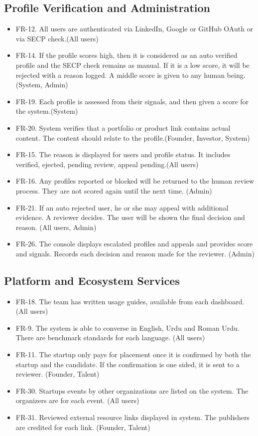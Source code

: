 \documentclass{FastFyp}
\begin{document}
\subsection{Profile Verification and Administration}
\begin{itemize}
\item FR-12. All users are authenticated via LinkedIn, Google or GitHub OAuth or via SECP check.(All users)
\item FR-14. If the profile scores high, then it is considered as an auto verified profile and the SECP check remains as manual. If it is a low score, it will be rejected with a reason logged. A middle score is given to any human being. (System, Admin)
\item FR-19. Each profile is assessed from their signals, and then given a score for the system.(System)
\item FR-20. System verifies that a portfolio or product link contains actual content. The content should relate to the profile.(Founder, Investor, System)
\item FR-15. The reason is displayed for users and profile status. It includes verified, ejected, pending review, appeal pending.(All users)
\item FR-16. Any profiles reported or blocked will be returned to the human review process. They are not scored again until the next time. (Admin)
\item FR-21. If an auto rejected user, he or she may appeal with additional evidence. A reviewer decides. The user will be shown the final decision and reason. (All users, Admin)
\item FR-26. The console displays escalated profiles and appeals and provides score and signals. Records each decision and reason made for the reviewer. (Admin)
\end{itemize}

\subsection{Platform and Ecosystem Services}
\begin{itemize}
\item FR-18. The team has written usage guides, available from each dashboard. (All users)
\item FR-9. The system is able to converse in English, Urdu and Roman Urdu. There are benchmark standards for each language. (All users)
\item FR-11. The startup only pays for placement once it is confirmed by both the startup and the candidate. If the confirmation is one sided, it is sent to a reviewer. (Founder, Talent)
\item FR-30. Startups events by other organizations are listed on the system. The organizers are for each event. (All users)
\item FR-31. Reviewed external resource links displayed in system. The publishers are credited for each link. (Founder, Talent)
\end{itemize}
\end{document}
